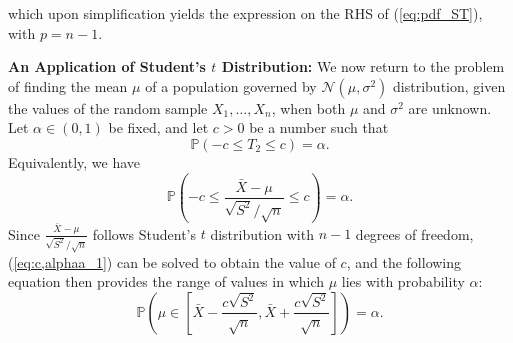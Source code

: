 \documentclass[a4paper,english,12pt]{article}
\begin{document}
which upon simplification yields the expression on the RHS of (\ref*{eq:pdf_ST}), with $ p=n-1 $.
\par 
\textbf{An Application of Student's $ t $ Distribution:} We now return to the problem of finding the mean $ \mu $ of a population governed by $ \mathcal{N}(\mu,\sigma^{2}) $ distribution, given the values of the random sample $ X_{1},\ldots,X_{n} $, when both $ \mu $ and $ \sigma^{2} $ are unknown. Let $ \alpha\in (0,1) $ be fixed, and let $ c>0 $ be a number such that
\begin{equation}
\mathbb{P}\left(-c \leq T_{2} \leq c\right)=\alpha.\label{eq:c,alphaa}
\end{equation} 
Equivalently, we have
\begin{equation}
\mathbb{P}\left(-c \leq \frac{\bar{X}-\mu}{\sqrt{S^{2}}/\sqrt{n}} \leq c \right)=\alpha. \label{eq:c,alphaa_1}
\end{equation}
Since $ \frac{\bar{X}-\mu}{\sqrt{S^{2}}/\sqrt{n}} $ follows Student's $ t $ distribution with $ n-1 $ degrees of freedom, (\ref*{eq:c,alphaa_1}) can be solved to obtain the value of $ c $, and the following equation then provides the range of values in which $ \mu $ lies with probability $ \alpha $:
\begin{equation}
\mathbb{P}\left(\mu \in \left[\bar{X}-\frac{c\sqrt{S^{2}}}{\sqrt{n}}, \bar{X}+\frac{c\sqrt{S^{2}}}{\sqrt{n}}\right] \right)=\alpha. \label{eq:c,alphaa_2}
\end{equation}
\end{document}
